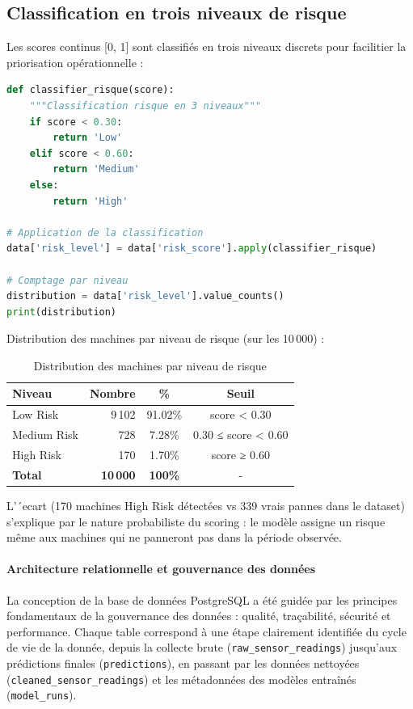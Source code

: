 \documentclass[a4paper,12pt]{report}
\begin{document}
\subsection{Classification en trois niveaux de risque}

Les scores continus [0, 1] sont classifiés en trois niveaux discrets pour facilitier la priorisation opérationnelle :

\begin{lstlisting}[language=Python]
def classifier_risque(score):
    """Classification risque en 3 niveaux"""
    if score < 0.30:
        return 'Low'
    elif score < 0.60:
        return 'Medium'
    else:
        return 'High'

# Application de la classification
data['risk_level'] = data['risk_score'].apply(classifier_risque)

# Comptage par niveau
distribution = data['risk_level'].value_counts()
print(distribution)
\end{lstlisting}

Distribution des machines par niveau de risque (sur les 10\,000) :

\begin{table}[H]
\centering
\small
\caption{Distribution des machines par niveau de risque}
\begin{tabular}{|l|r|c|c|}
\hline
\textbf{Niveau} & \textbf{Nombre} & \textbf{\%} & \textbf{Seuil} \\
\hline\hline
Low Risk & 9\,102 & 91.02\% & score < 0.30 \\
\hline
Medium Risk & 728 & 7.28\% & 0.30 ≤ score < 0.60 \\
\hline
High Risk & 170 & 1.70\% & score ≥ 0.60 \\
\hline
\textbf{Total} & \textbf{10\,000} & \textbf{100\%} & - \\
\hline
\end{tabular}
\end{table}

L'´ecart (170 machines High Risk détectées vs 339 vrais pannes dans le dataset) s'explique par le nature probabiliste du scoring : le modèle assigne un risque même aux machines qui ne panneront pas dans la période observée.


\paragraph{Architecture relationnelle et gouvernance des données}

La conception de la base de données PostgreSQL a été guidée par les principes fondamentaux de la gouvernance des données : qualité, traçabilité, sécurité et performance. Chaque table correspond à une étape clairement identifiée du cycle de vie de la donnée, depuis la collecte brute (\texttt{raw\_sensor\_readings}) jusqu'aux prédictions finales (\texttt{predictions}), en passant par les données nettoyées (\texttt{cleaned\_sensor\_readings}) et les métadonnées des modèles entraînés (\texttt{model\_runs}).
\end{document}
